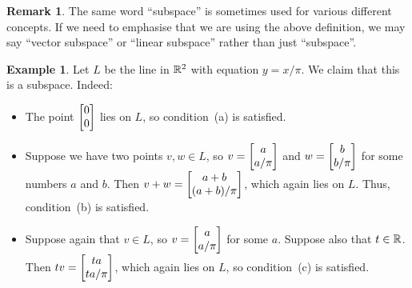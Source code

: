 \documentclass[reqno]{amsart}
\theoremstyle{definition}
\newtheorem{remark}[theorem]{Remark}
\newtheorem{example}[theorem]{Example}
\begin{document}
\begin{remark}\label{rem-subspace-terminology}
 The same word ``subspace'' is sometimes used for various different
 concepts.  If we need to emphasise that we are using the above
 definition, we may say ``vector subspace'' or ``linear subspace''
 rather than just ``subspace''.
\end{remark}

\begin{example}\label{eg-line-subspace}
 Let $L$ be the line in ${\mathbb{R}}^2$ with equation $y=x/\pi$.  We claim that
 this is a subspace.  Indeed:
 \begin{itemize}
  \item The point $\left[\begin{matrix} 0\\0\end{matrix}\right]$ lies on $L$, so condition~(a) is
   satisfied.
  \item Suppose we have two points $v,w\in L$, so
   $v=\left[\begin{matrix} a\\ a/\pi\end{matrix}\right]$ and $w=\left[\begin{matrix} b\\ b/\pi\end{matrix}\right]$ for some numbers
   $a$ and $b$.  Then $v+w=\left[\begin{matrix} a+b\\ (a+b)/\pi\end{matrix}\right]$, which again lies
   on $L$.  Thus, condition~(b) is satisfied.

   \bigskip

   \begin{center}
   \end{center}

   \bigskip

  \item Suppose again that $v\in L$, so $v=\left[\begin{matrix} a\\ a/\pi\end{matrix}\right]$ for
   some $a$.  Suppose also that $t\in{\mathbb{R}}$.  Then
   $tv=\left[\begin{matrix} ta\\ ta/\pi\end{matrix}\right]$, which again lies on $L$, so
   condition~(c) is satisfied.
 \end{itemize}
\end{example}
\end{document}
